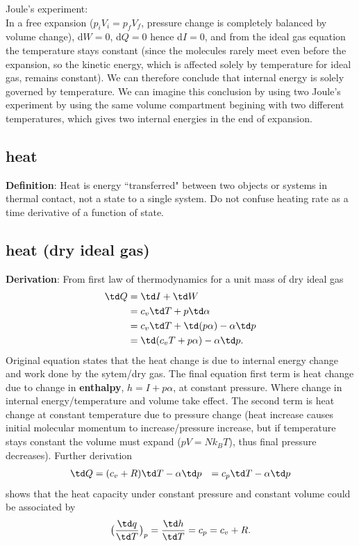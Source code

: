{Joule's experiment:} \\
In a free expansion ($p_iV_i = p_fV_f$, pressure change is completely balanced by volume change),
d$W = 0$, d$Q = 0$ hence d$I = 0$, and from the ideal gas equation the temperature stays constant
(since the molecules rarely meet even before the expansion, so the kinetic energy, which is affected
solely by temperature for ideal gas, remains constant). We can therefore conclude that internal
energy is solely governed by temperature. We can imagine this conclusion by using two Joule's
experiment by using the same volume compartment begining with two different temperatures, which
gives two internal energies in the end of expansion. 


\subsection{heat}
{\bf{Definition}}: Heat is energy ``transferred" between two objects or systems in thermal contact, not
a state to a single system. Do not confuse heating rate as a time derivative of a function of state.


\subsection{heat (dry ideal gas)}
{\bf{Derivation}}: From first law of thermodynamics for a unit mass of dry ideal gas
\begin{equation} \label{eq:energy_cv}
\begin{aligned}
  \td Q & = \td I + \td W \\
        & = c_v \td T + p \td \alpha \\
        & = c_v \td T + \td(p\alpha) - \alpha \td p \\
        & = \td (c_v T + p\alpha) - \alpha \td p. 
\end{aligned}
\end{equation}
Original equation states that the heat change is due to internal energy change and work done by the
sytem/dry gas. The final equation first term is heat change due to change in {\bf{enthalpy}}, $h = I
+ p\alpha$, at constant pressure. Where change in internal energy/temperature and volume take
effect. The second term is heat change at constant temperature due to pressure change (heat increase
causes initial molecular momentum to increase/pressure increase, but if temperature stays constant
the volume must expand ($pV=Nk_BT$), thus final pressure decreases). Further derivation 
\begin{equation} \label{eq:energy_cp}
\begin{aligned}
  \td Q & = (c_v + R) \td T - \alpha \td p
        & = c_p \td T - \alpha \td p
\end{aligned}
\end{equation}
shows that the heat capacity under constant pressure and constant volume could be associated by
\begin{equation}
  \big( \frac{\td q}{\td T} \big)_p = \frac{\td h}{\td T} =  c_p = c_v + R.
\end{equation}

